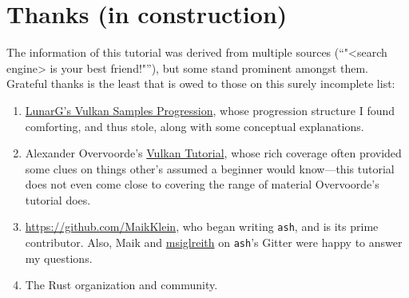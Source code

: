 \documentclass[12pt,letterpaper]{article}
\newcommand{\inquotes}[1]{``#1''}	%
\newcommand{\ash}{\texttt{ash}}
\begin{document}
\section{Thanks (in construction)}
	The information of this tutorial was derived from multiple sources (\inquotes{"<search engine> is your best friend!"}), but some stand prominent amongst them. Grateful thanks is the least that is owed to those on this surely incomplete list:
		\begin{enumerate}
			\item \href{https://vulkan.lunarg.com/doc/sdk/1.0.65.1/windows/tutorial/html/index.html}{LunarG's Vulkan Samples Progression}, whose progression structure I found comforting, and thus stole, along with some conceptual explanations. 
			
			\item Alexander Overvoorde's \href{https://vulkan-tutorial.com/}{Vulkan Tutorial}, whose rich coverage often provided some clues on things other's assumed a beginner would know---this tutorial does not even come close to covering the range of material Overvoorde's tutorial does.
			
			\item \href{Maik Klein}{https://github.com/MaikKlein}, who began writing \ash, and is its prime contributor. Also, Maik and \href{https://github.com/msiglreith}{msiglreith} on \ash's Gitter were happy to answer my questions.
			
			\item The Rust organization and community.
		\end{enumerate}
\printbibliography
\end{document}
